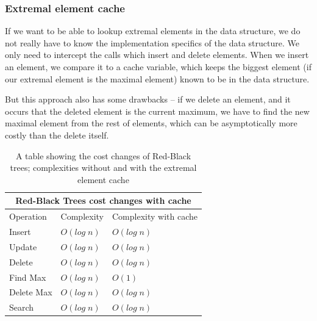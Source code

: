 \documentclass[a4paper,11pt]{article}
\begin{document}
		\subsubsection{Extremal element cache}

			If we want to be able to lookup extremal elements in the data structure, we do not really have
			to know the implementation specifics of the data structure. We only need to intercept the calls
			which insert and delete elements. When we insert an element, we compare it to a cache variable,
			which keeps the biggest element (if our extremal element is the maximal element) known to be in
			the data structure.

			But this approach also has some drawbacks -- if we delete an element, and it occurs that the deleted
			element is the current maximum, we have to find the new maximal element from the rest of
			elements, which can be asymptotically more costly than the delete itself.

				\begin{table}[h!]
				\centering
				\begin{tabular}{|l|l|l|}
					\hline
					\multicolumn{3}{|c|}{Red-Black Trees cost changes with cache} \\
					\hline
					Operation & Complexity & Complexity with cache \\
					\hline
					Insert 	        & $O(log \; n)$ & $O(log \; n)$ \\
					Update          & $O(log \; n)$ & $O(log \; n)$ \\
					Delete	        & $O(log \; n)$ & $O(log \; n)$ \\
					Find Max 	& $O(log \; n)$ & {\color{darkgreen}$O(1)$}\\
					Delete Max	& $O(log \; n)$ & $O(log \; n)$ \\
					Search 		& $O(log \; n)$ & $O(log \; n)$ \\
					\hline
				\end{tabular}
				\caption{A table showing the cost changes of Red-Black trees; complexities without and with the
				extremal element cache}
				\label{tab:rbt-cost-change}
			\end{table}
\end{document}
